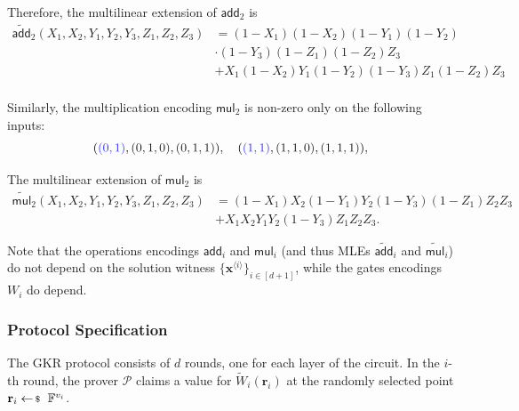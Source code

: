\documentclass[../../book.tex]{subfiles}
\begin{document}
Therefore, the multilinear extension of $\mathsf{add}_2$ is
\begin{align*}
    \widetilde{\mathsf{add}}_2(X_1,X_2,Y_1,Y_2,Y_3,Z_1,Z_2,Z_3) &= (1-X_1)(1-X_2)(1-Y_1)(1-Y_2)\\
    &\cdot (1-Y_3)(1-Z_1)(1-Z_2)Z_3 \\
    &+ X_1(1-X_2)Y_1(1-Y_2)(1-Y_3)Z_1(1-Z_2)Z_3 \\
\end{align*}

Similarly, the multiplication encoding $\mathsf{mul}_2$ is non-zero only on the
following inputs:
\begin{equation*}
    (\textcolor{blue!80}{(0,1)},\textcolor{gray!20!black}{(0,1,0)},\textcolor{gray!20!black}{(0,1,1)}), 
    \quad
    (\textcolor{blue!80}{(1,1)},\textcolor{gray!20!black}{(1,1,0)},\textcolor{gray!20!black}{(1,1,1)}),
\end{equation*}

The multilinear extension of $\mathsf{mul}_2$ is
\begin{align*}
    \widetilde{\mathsf{mul}}_2(X_1,X_2,Y_1,Y_2,Y_3,Z_1,Z_2,Z_3) &= (1-X_1)X_2(1-Y_1)Y_2(1-Y_3)(1-Z_1)Z_2Z_3 \\
    &+ X_1X_2Y_1Y_2(1-Y_3)Z_1Z_2Z_3.
\end{align*}

\begin{remark}
    Note that the operations encodings $\mathsf{add}_i$ and $\mathsf{mul}_i$
    (and thus MLEs $\widetilde{\mathsf{add}}_i$ and
    $\widetilde{\mathsf{mul}}_i$) do not depend on the solution witness
    $\{\mathbf{x}^{\langle i \rangle}\}_{i \in [d+1]}$, while the gates
    encodings $W_i$ do depend.
\end{remark}

\subsubsection{Protocol Specification}

The GKR protocol consists of $d$ rounds, one for each layer of the circuit. In
the $i$-th round, the prover $\mathcal{P}$ claims a value for
$\widetilde{W}_i(\mathbf{r}_i)$ at the randomly selected point $\mathbf{r}_i
\leftarrowS \mathbb{F}^{v_i}$. 
\end{document}
